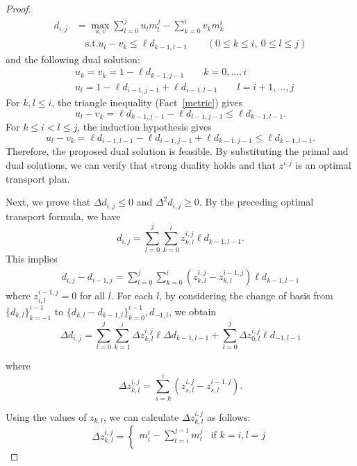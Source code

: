 \documentclass[pdflatex,sn-mathphys-num]{sn-jnl}%
\theoremstyle{thmstyleone}%
\theoremstyle{thmstyletwo}%
\theoremstyle{thmstylethree}%
\begin{document}
\begin{proof}
\begin{align*}
  d_{i,j} &=  \max_{u, v} \sum^j_{l=0}u_l m^j_l-\sum^i_{k=0}v_k m^i_k\\
    & \quad \text{s.t.} u_l-v_k \le \ell d_{k-1,l-1} \qquad (0\le k\le i,\ 0\le l\le j)
 \end{align*}
and the following dual solution:
\begin{align*}
             &u_k=v_k=1-\ell d_{k-1,j-1}           \qquad k=0,\dots, i
             \\&u_l=1-\ell d_{i-1,j-1}+\ell d_{i-1,l-1}           \qquad  l=i+1,\dots, j
\end{align*}
For $k,l \le i$, the triangle inequality (Fact~\ref{metric}) gives
\[u_l-v_k = \ell d_{k-1,j-1}-\ell d_{l-1,j-1} \le \ell d_{k-1,l-1}.\]
For $k \le i <l \le j$, the induction hypothesis gives
\[u_l-v_k =\ell d_{i-1,l-1}- \ell d_{i-1,j-1}+\ell d_{k-1,j-1} \le \ell d_{k-1,l-1}.\]
Therefore, the proposed dual solution is feasible. By substituting the primal and dual solutions, we can verify that strong duality holds and that $z^{i,j}$ is an optimal transport plan.


Next, we prove that $\Delta d_{i,j} \le 0$ and $\Delta^2d_{i,j} \ge 0$.
By the preceding optimal transport formula, we have
\[
d_{i,j} =  \sum_{l=0}^{j} \sum_{k=0}^{i} z^{i,j}_{k,l} \ell d_{k-1,l-1}.
\]
This implies
\begin{align*}
    d_{i,j}-d_{i-1,j} = \sum_{l=0}^{j} \sum_{k=0}^{i} (z^{i,j}_{k,l}-z^{i-1,j}_{k,l}) \ell d_{k-1,l-1}
\end{align*}
where $z^{i-1,j}_{i,l}=0$ for all $l$.
For each $l$, by considering the change of basis from $\{d_{k,l}\}^{i-1}_{k=-1}$ to $\{d_{k,l}-d_{k-1,l}\}^{i-1}_{k=0}, d_{-1,l}$, we obtain
\[
\Delta d_{i,j} =  \sum_{l=0}^{j} \sum_{k=1}^{i} \Delta z^{i,j}_{k,l} \ell \Delta d_{k-1,l-1} + \sum_{l=0}^{j} \Delta z^{i,j}_{0,l}  \ell d_{-1,l-1}
\]

where
\[
\Delta z^{i,j}_{k,l}
=
\sum_{s=k}^{i} \left( z^{i,j}_{s,l} - z^{i-1,j}_{s,l} \right).
\]

Using the values of $z_{k,l}$, we can calculate \(\Delta z^{i,j}_{k,l}\) as follows:
\[
\Delta z^{i,j}_{k,l}
=
\begin{cases}
\displaystyle
m^i_i-\displaystyle\sum_{t=i}^{j-1} m^{j}_{t}
&\text{if } k=i,  l = j \\[10pt]



\end{cases}\]
\end{proof}
\end{document}
